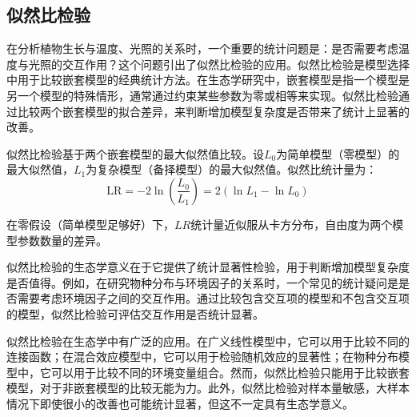 \documentclass[
  twoside,12pt,fontset=none]{ctexbook}
\begin{document}
\hypertarget{ux4f3cux7136ux6bd4ux68c0ux9a8c}{%
\subsection{似然比检验}\label{ux4f3cux7136ux6bd4ux68c0ux9a8c}}

在分析植物生长与温度、光照的关系时，一个重要的统计问题是：是否需要考虑温度与光照的交互作用？这个问题引出了似然比检验的应用。似然比检验是模型选择中用于比较嵌套模型的经典统计方法。在生态学研究中，嵌套模型是指一个模型是另一个模型的特殊情形，通常通过约束某些参数为零或相等来实现。似然比检验通过比较两个嵌套模型的拟合差异，来判断增加模型复杂度是否带来了统计上显著的改善。

似然比检验基于两个嵌套模型的最大似然值比较。设\(L_0\)为简单模型（零模型）的最大似然值，\(L_1\)为复杂模型（备择模型）的最大似然值。似然比统计量为：
\[\text{LR} = -2 \ln\left(\frac{L_0}{L_1}\right) = 2(\ln L_1 - \ln L_0)\]

在零假设（简单模型足够好）下，\(LR\)统计量近似服从卡方分布，自由度为两个模型参数数量的差异。

似然比检验的生态学意义在于它提供了统计显著性检验，用于判断增加模型复杂度是否值得。例如，在研究物种分布与环境因子的关系时，一个常见的统计疑问是是否需要考虑环境因子之间的交互作用。通过比较包含交互项的模型和不包含交互项的模型，似然比检验可评估交互作用是否统计显著。

似然比检验在生态学中有广泛的应用。在广义线性模型中，它可以用于比较不同的连接函数；在混合效应模型中，它可以用于检验随机效应的显著性；在物种分布模型中，它可以用于比较不同的环境变量组合。然而，似然比检验只能用于比较嵌套模型，对于非嵌套模型的比较无能为力。此外，似然比检验对样本量敏感，大样本情况下即使很小的改善也可能统计显著，但这不一定具有生态学意义。
\end{document}
